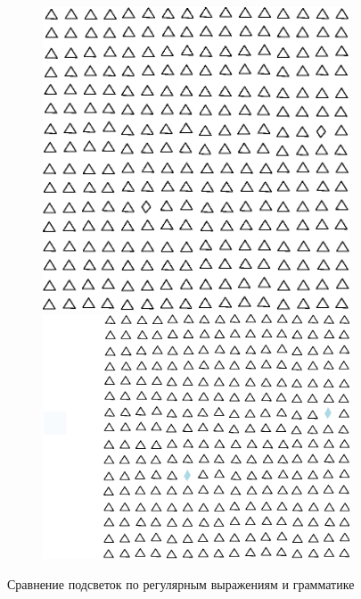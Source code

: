 \documentclass[14pt, openany]{report}
\begin{document}
\begin{figure}[h]
  \centering
  \begin{subfigure}{\linewidth}
    \includegraphics[scale=0.8]{uncolored}\hfill
    \includegraphics[scale=0.8]{colored}
  \end{subfigure}
  \label{fig:highlightingComp}
  \caption{Сравнение подсветок по регулярным выражениям и грамматике}
\end{figure}
\end{document}
